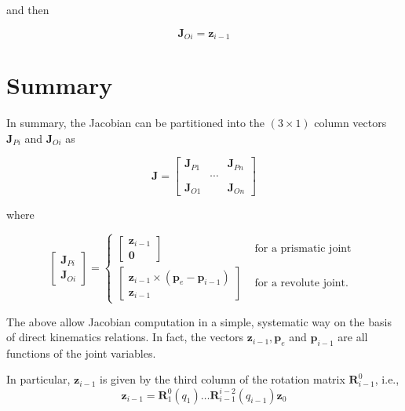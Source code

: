 \documentclass[10pt]{article}
\begin{document}
and then

$$
\boldsymbol{J}_{O i}=\boldsymbol{z}_{i-1}
$$

\section{Summary}





In summary, the Jacobian can be partitioned into the $(3 \times 1)$ column vectors $\boldsymbol{J}_{P i}$ and $\boldsymbol{J}_{O i}$ as

$$
\boldsymbol{J}=\left[\begin{array}{lll}
\boldsymbol{J}_{P 1} & & \boldsymbol{J}_{P n} \\
& \cdots & \\
\boldsymbol{J}_{O 1} & & \boldsymbol{J}_{O n}
\end{array}\right]
$$

where

\begin{equation} \label{c2.l1.equ5}
    \left[\begin{array}{l}
\boldsymbol{J}_{P i} \\
\boldsymbol{J}_{O i}
\end{array}\right]= \begin{cases}{\left[\begin{array}{c}
\boldsymbol{z}_{i-1} \\
\mathbf{0}
\end{array}\right]} & \text { for a prismatic joint } \\[14pt]
{\left[\begin{array}{cc}
\boldsymbol{z}_{i-1} \times\left(\boldsymbol{p}_{e}-\boldsymbol{p}_{i-1}\right) \\
\boldsymbol{z}_{i-1}
\end{array}\right]} & \text { for a revolute joint. }\end{cases}
\end{equation}

The above allow Jacobian computation in a simple, systematic way on the basis of direct kinematics relations. In fact, the vectors $\boldsymbol{z}_{i-1}, \boldsymbol{p}_{e}$ and $\boldsymbol{p}_{i-1}$ are all functions of the joint variables. 

In particular,
$\boldsymbol{z}_{i-1}$ is given by the third column of the rotation matrix $\boldsymbol{R}_{i-1}^{0}$, i.e.,
  $$
\boldsymbol{z}_{i-1}=\boldsymbol{R}_{1}^{0}\left(q_{1}\right) \ldots \boldsymbol{R}_{i-1}^{i-2}\left(q_{i-1}\right) \boldsymbol{z}_{0}
$$
\end{document}
